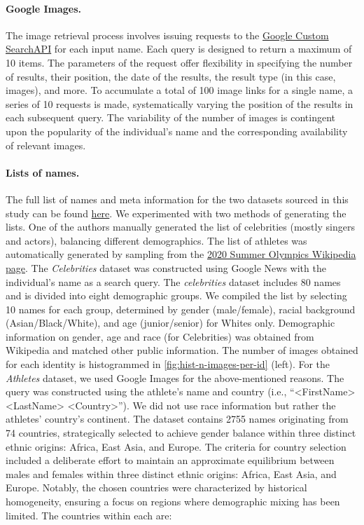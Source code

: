 \documentclass[10pt,twocolumn,letterpaper]{article}
\begin{document}
\begin{appendices}
\paragraph{Google Images.}  The image retrieval process involves issuing requests to the \href{https://developers.google.com/custom-search/v1/overview}{Google Custom SearchAPI} for each input name. Each query is designed to return a maximum of 10 items. The parameters of the request offer flexibility in specifying the number of results, their position, the date of the results, the result type (in this case, images), and more. To accumulate a total of 100 image links for a single name, a series of 10 requests is made, systematically varying the position of the results in each subsequent query. The variability of the number of images is contingent upon the popularity of the individual's name and the corresponding availability of relevant images.

\paragraph{Lists of names.} 
The full list of names and meta information for the two datasets sourced in this study can be found \href{https://github.com/caltechvisionlab/frt-rapid-test/tree/main/paper-supplement}{here}.
%
We experimented with two methods of generating the lists. One of the authors manually generated the list of celebrities (mostly singers and actors), balancing different demographics. The list of athletes was automatically generated by sampling from the  \href{https://en.wikipedia.org/wiki/Category:Nations_at_the_2020_Summer_Olympics}{2020 Summer Olympics Wikipedia page}.
%
The \textit{Celebrities} dataset was constructed using Google News with the individual's name as a search query. The \textit{celebrities} dataset includes 80 names and is divided into eight demographic groups. We compiled the list by selecting 10 names for each group, determined by gender (male/female), racial background (Asian/Black/White), and age (junior/senior) for Whites only. Demographic information on gender, age and race (for Celebrities) was obtained from Wikipedia and matched other public information. The number of images obtained for each identity is histogrammed in \cref{fig:hist-n-images-per-id} (left).
%
For the \textit{Athletes} dataset, we used Google Images for the above-mentioned reasons. The query was constructed using the athlete's name and country (i.e., ``<FirstName> <LastName> <Country>''). We did not use race information but rather the athletes' country's continent. The dataset contains 2755 names originating from 74 countries, strategically selected to achieve gender balance within three distinct ethnic origins: Africa, East Asia, and Europe.  The criteria for country selection included a deliberate effort to maintain an approximate equilibrium between males and females within three distinct ethnic origins: Africa, East Asia, and Europe. Notably, the chosen countries were characterized by historical homogeneity, ensuring a focus on regions where demographic mixing has been limited. The countries within each are: 


\end{appendices}
\end{document}
